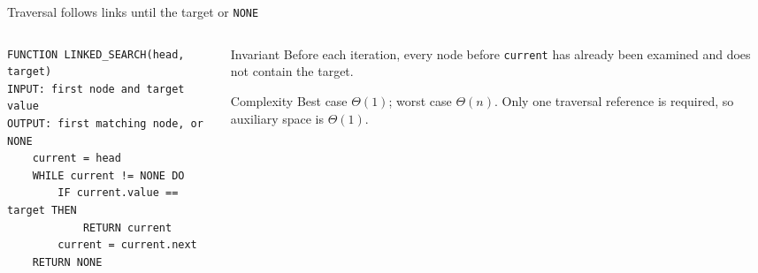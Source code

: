 \documentclass[aspectratio=169]{beamer}
\begin{document}
\begin{frame}[fragile]{Traversal follows links until the target or \texttt{NONE}}
\begin{columns}[T]
\begin{column}{0.58\textwidth}
\begin{lstlisting}[style=pseudonumbered]
FUNCTION LINKED_SEARCH(head, target)
INPUT: first node and target value
OUTPUT: first matching node, or NONE
    current = head
    WHILE current != NONE DO
        IF current.value == target THEN
            RETURN current
        current = current.next
    RETURN NONE
\end{lstlisting}
\end{column}
\begin{column}{0.38\textwidth}
\begin{block}{Invariant}
Before each iteration, every node before \texttt{current} has already been examined and does not contain the target.
\end{block}
\begin{exampleblock}{Complexity}
Best case $\Theta(1)$; worst case $\Theta(n)$. Only one traversal reference is required, so auxiliary space is $\Theta(1)$.
\end{exampleblock}
\end{column}
\end{columns}
\end{frame}
\end{document}
